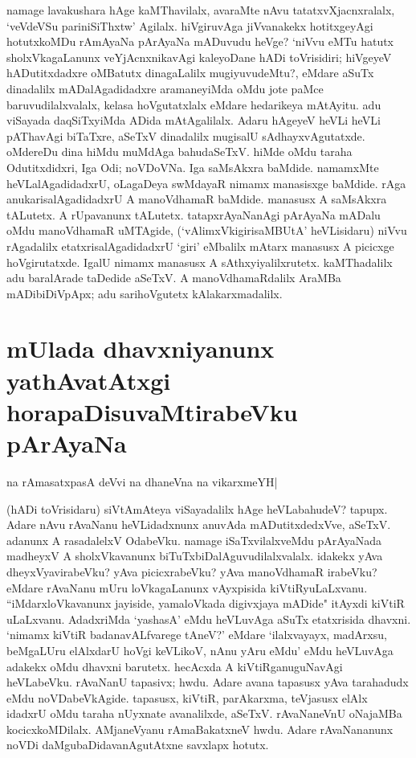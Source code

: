 namage lavakushara hAge kaMThavilalx, avaraMte nAvu tatatxvXjacnxralalx, `veVdeVSu pariniSiThxtw' Agilalx. hiVgiruvAga jiVvanakekx hotitxgeyAgi hotutxkoMDu rAmAyaNa pArAyaNa mADuvudu heVge? `niVvu eMTu hatutx sholxVkagaLanunx veYjAcnxnikavAgi kaleyoDane hADi toVrisidiri; hiVgeyeV hADutitxdadxre oMBatutx dinagaLalilx mugiyuvudeMtu?, eMdare aSuTx dinadalilx mADalAgadidadxre aramaneyiMda oMdu jote paMce baruvudilalxvalalx, kelasa hoVgutatxlalx eMdare hedarikeya mAtAyitu. adu viSayada daqSiTxyiMda ADida mAtAgalilalx. Adaru hAgeyeV heVLi heVLi pAThavAgi biTaTxre, aSeTxV dinadalilx mugisalU sAdhayxvAgutatxde. oMdereDu dina hiMdu muMdAga bahudaSeTxV. hiMde oMdu taraha Odutitxdidxri, Iga Odi; noVDoVNa. Iga saMsAkxra baMdide. namamxMte heVLalAgadidadxrU, oLagaDeya swMdayaR nimamx manasisxge baMdide. rAga anukarisalAgadidadxrU A manoVdhamaR baMdide. manasusx A saMsAkxra tALutetx. A rUpavanunx tALutetx. tatapxrAyaNanAgi pArAyaNa mADalu oMdu manoVdhamaR uMTAgide, (`vAlimxVkigirisaMBUtA' heVLisidaru) niVvu rAgadalilx etatxrisalAgadidadxrU `giri' eMbalilx mAtarx manasusx A picicxge hoVgirutatxde. IgalU nimamx manasusx A sAthxyiyalilxrutetx. kaMThadalilx adu baralArade taDedide aSeTxV. A manoVdhamaRdalilx AraMBa mADibiDiVpApx; adu sarihoVgutetx kAlakarxmadalilx. 

\section*{mUlada dhavxniyanunx yathAvatAtxgi horapaDisuvaMtirabeVku pArAyaNa} 

\begin{shloka} 
na rAmasatxpasA deVvi na dhaneVna na vikarxmeYH| \label{191}
\end{shloka}

(hADi toVrisidaru) siVtAmAteya viSayadalilx hAge heVLabahudeV? tapupx. Adare nAvu rAvaNanu heVLidadxnunx anuvAda mADutitxdedxVve, aSeTxV. adanunx A rasadalelxV OdabeVku. namage iSaTxvilalxveMdu pArAyaNada madheyxV A sholxVkavanunx biTuTxbiDalAguvudilalxvalalx. idakekx yAva dheyxVyavirabeVku? yAva picicxrabeVku? yAva manoVdhamaR irabeVku? eMdare rAvaNanu mUru loVkagaLanunx vAyxpisida kiVtiRyuLaLxvanu. ``iMdarxloVkavanunx jayiside, yamaloVkada digivxjaya mADide" itAyxdi kiVtiR uLaLxvanu. AdadxriMda `yashasA' eMdu heVLuvAga aSuTx etatxrisida dhavxni. `nimamx kiVtiR badanavALfvarege tAneV?' eMdare `ilalxvayayx, madArxsu, beMgaLUru elAlxdarU hoVgi keVLikoV, nAnu yAru eMdu' eMdu heVLuvAga adakekx oMdu dhavxni barutetx. hecAcxda A kiVtiRganuguNavAgi heVLabeVku. rAvaNanU tapasivx; hwdu. Adare avana tapasusx yAva tarahadudx eMdu noVDabeVkAgide. tapasusx, kiVtiR, parAkarxma, teVjasusx elAlx idadxrU oMdu taraha nUyxnate avanalilxde, aSeTxV. rAvaNaneVnU oNajaMBa kocicxkoMDilalx. AMjaneVyanu rAmaBakatxneV hwdu. Adare rAvaNananunx noVDi daMgubaDidavanAgutAtxne savxlapx hotutx. 

